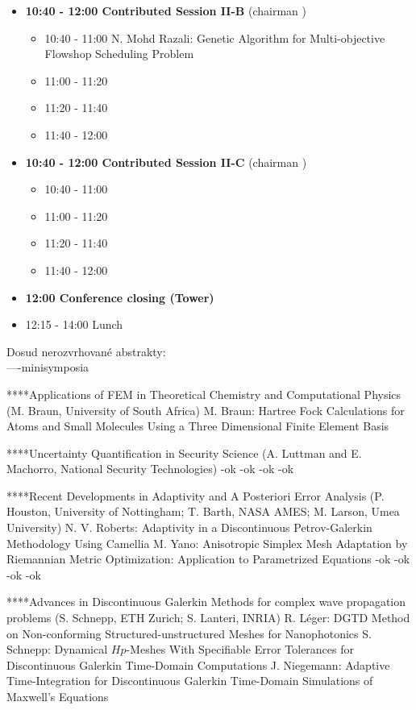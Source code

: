 \documentclass[10pt, A4]{article}%
\begin{document}
\begin{itemize}
  \item {\bf 10:40 - 12:00 Contributed Session II-B} (chairman ) 
  \begin{itemize}
    \item 10:40 - 11:00 {N. Mohd Razali}: {Genetic Algorithm for Multi-objective Flowshop Scheduling Problem}
    \item 11:00 - 11:20 
    \item 11:20 - 11:40 
    \item 11:40 - 12:00  
  \end{itemize}
  \item {\bf 10:40 - 12:00 Contributed Session II-C} (chairman ) 
  \begin{itemize}
    \item 10:40 - 11:00 
    \item 11:00 - 11:20 
    \item 11:20 - 11:40 
    \item 11:40 - 12:00 
  \end{itemize}
  \item {\bf 12:00 Conference closing (Tower)}
  \item 12:15 - 14:00 Lunch
\newpage
\end{itemize}

\newpage
Dosud nerozvrhované abstrakty:\\
----minisymposia 

****Applications of FEM in Theoretical Chemistry and Computational Physics (M. Braun, University of South Africa)
{M. Braun}: {Hartree Fock Calculations for Atoms and Small Molecules Using  a Three Dimensional Finite Element Basis}




****Uncertainty Quantification in Security Science (A. Luttman and E. Machorro, National Security Technologies)
-ok
-ok
-ok
-ok

****Recent Developments in Adaptivity and A Posteriori Error Analysis (P. Houston, University of Nottingham; T. Barth, NASA AMES; M. Larson, Umea University)
{N. V. Roberts}: {Adaptivity in a Discontinuous Petrov-Galerkin Methodology Using Camellia}
{M. Yano}: {Anisotropic Simplex Mesh Adaptation by Riemannian Metric Optimization: Application to Parametrized Equations}
-ok
-ok
-ok
-ok


****Advances in Discontinuous Galerkin Methods for complex wave propagation problems (S. Schnepp, ETH Zurich; S. Lanteri, INRIA)
{R. Léger}: {DGTD  Method  on  Non-conforming  Structured-unstructured  Meshes  for Nanophotonics}
{S. Schnepp}: {Dynamical $Hp$-Meshes With Specifiable Error Tolerances for Discontinuous Galerkin Time-Domain Computations}
{J. Niegemann}: {Adaptive Time-Integration for Discontinuous Galerkin Time-Domain Simulations of Maxwell's Equations}
\end{document}
